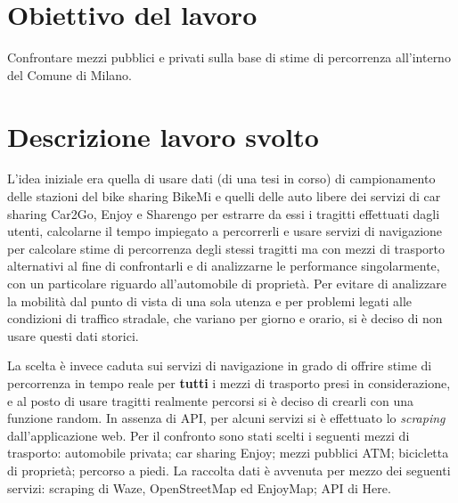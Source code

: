 \documentclass[a4paper,12pt]{article}
\title{}
\date{Fine tirocinio: \Large{27/01/2021}}
\begin{document}
\maketitle
\vspace{1cm}
	
\section{Obiettivo del lavoro}
Confrontare mezzi pubblici e privati sulla base di stime di percorrenza all'interno del Comune di Milano.

\section{Descrizione lavoro svolto}
L'idea iniziale era quella di usare dati (di una tesi in corso) di campionamento delle stazioni del bike sharing BikeMi e quelli delle auto libere dei servizi di car sharing Car2Go, Enjoy e Sharengo per estrarre da essi i tragitti effettuati dagli utenti, calcolarne il tempo impiegato a percorrerli e usare servizi di navigazione per calcolare stime di percorrenza degli stessi tragitti ma con mezzi di trasporto alternativi al fine di confrontarli e di analizzarne le performance singolarmente, con un particolare riguardo all'automobile di proprietà.
Per evitare di analizzare la mobilità dal punto di vista di una sola utenza e per problemi legati alle condizioni di traffico stradale, che variano per giorno e orario, si è deciso di non usare questi dati storici.

La scelta è invece caduta sui servizi di navigazione in grado di offrire stime di percorrenza in tempo reale per \textbf{tutti} i mezzi di trasporto presi in considerazione, e al posto di usare tragitti realmente percorsi si è deciso di crearli con una funzione random. In assenza di API, per alcuni servizi si è effettuato lo \textit{scraping} dall'applicazione web. Per il confronto sono stati scelti i seguenti mezzi di trasporto: automobile privata; car sharing Enjoy; mezzi pubblici ATM; bicicletta di proprietà; percorso a piedi. La raccolta dati è avvenuta per mezzo dei seguenti servizi: scraping di Waze, OpenStreetMap ed EnjoyMap; API di Here.
\end{document}
